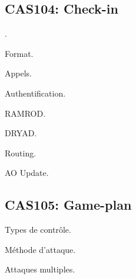 \newpage


\begin{onepage}
	
	\section{CAS104: Check-in}
	
	\begin{e1}
		
		\item {}.
		
		\item Format.
		
		\item Appels.
		
		\item Authentification.
		
		\begin{e2}
			
			\item RAMROD.
			
			\item DRYAD.
			
		\end{e2}
		
		\item Routing.
		
		\item AO Update.
		
	\end{e1}
\end{onepage}

\newpage


\begin{onepage}
	
	\section{CAS105: Game-plan}
	
	\begin{e1}
		
		\item Types de contrôle.
		
		\item Méthode d'attaque.
		
		\item Attaques multiples.
		
	\end{e1}
\end{onepage}

\newpage


